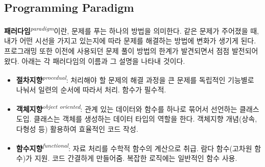 \subsection{Programming Paradigm}

\textbf{패러다임}\textit{\textsuperscript{paradigm}}이란, 문제를 푸는 하나의 방법을 의미한다. 같은 문제가 주어졌을 때, 내가 어떤 시선을 가지고 있는지에 따라 문제를 해결하는 방법에 변화가 생기게 된다. 프로그래밍 또한 이전에 사용되던 문제 풀이 방법의 한계가 발견되면서 점점 발전되어왔다. 아래는 각 패러다임의 이름과 그 설명을 나타내 것이다.

\begin{itemize}
    \item \textbf{절차지향}\textit{\textsuperscript{procedual}}: 처리해야 할 문제의 해결 과정을 큰 문제를 독립적인 기능별로 나눠서 일련의 순서에 따라서 처리. 함수가 필수적.
    \item \textbf{객체지향}\textit{\textsuperscript{object oriented}}: 관계 있는 데이터와 함수를 하나로 묶어서 선언하는 클래스 도입. 클래스는 객체를 생성하는 데이터 타입의 역할을 한다. 객체지향 개념(상속, 다형성 등) 활용하여 효율적인 코드 작성.
    \item \textbf{함수지향}\textit{\textsuperscript{functional}}: 자료 처리를 수학적 함수의 계산으로 취급. 람다 함수(고차원 함수)가 지원. 코드 간결하게 만들어줌. 복잡한 로직에는 일반적인 함수 사용.
\end{itemize}
